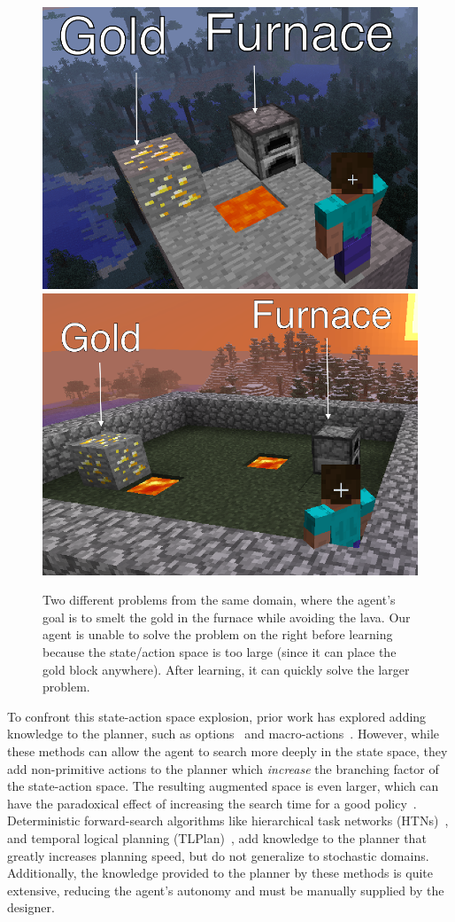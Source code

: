 \documentclass[letterpaper]{article}
\begin{document}
\begin{figure}
\centering
\includegraphics[width=0.49\linewidth]{figures/smelt_small.png}
\includegraphics[width=0.49\linewidth]{figures/smelt_large.png}
\caption{Two different problems from the same domain, where the
  agent's goal is to smelt the gold in the furnace while avoiding the
  lava.  Our agent is unable to solve the problem on the right before
  learning because the state/action space is too large (since it can
  place the gold block anywhere).  After learning, it can quickly
  solve the larger problem.\label{fig:example}}
\end{figure}


To confront this state-action space explosion, prior work has explored
adding knowledge to the planner, such as options~\cite{sutton99} and
macro-actions~\cite{Botea:2005kx,Newton:2005vn}.  However, while these
methods can allow the agent to search more deeply in the state space,
they add non-primitive actions to the planner which {\em increase} the
branching factor of the state-action space.  The resulting augmented
space is even larger, which can have the paradoxical effect of
increasing the search time for a good policy~\cite{Jong:2008zr}.
Deterministic forward-search algorithms like hierarchical task
networks (HTNs)~\citep{Nau:1999:SSH:1624312.1624357}, and temporal
logical planning
(TLPlan)~\citep{Bacchus95usingtemporal,Bacchus99usingtemporal}, add
knowledge to the planner that greatly increases planning speed, but do
not generalize to stochastic domains. Additionally, the knowledge
provided to the planner by these methods is quite extensive, reducing
the agent's autonomy and must be manually supplied by the designer.
\end{document}
